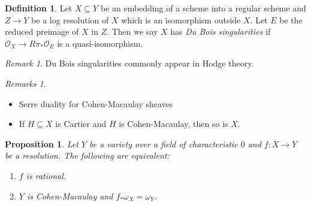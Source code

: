 \documentclass[leqno, openany]{memoir}
\newtheorem{prop}[thm]{Proposition}
\theoremstyle{definition}
\newtheorem{defn}[thm]{Definition}
\theoremstyle{remark}
\newtheorem{rmk}[thm]{Remark}
\newtheorem{rmks}[thm]{Remarks}
\theoremstyle{plain}
\theoremstyle{definition}
\theoremstyle{remark}
\newcommand{\msc}[1]{\mathscr{#1}}
\begin{document}
\begin{defn}
    Let $X \subseteq Y$ be an embedding of a scheme into a regular scheme and $Z \to Y$ be a log resolution of $X$ which is an isomorphism outside $X$. Let $E$ be the reduced preimage of $X$ in $Z$. Then we say $X$ has \textit{Du Bois singularities} if $\msc{O}_X \to R\pi_* \msc{O}_E$ is a quasi-isomorphism.
\end{defn}

\begin{rmk}
    Du Bois singularities commonly appear in Hodge theory.
\end{rmk}

\begin{rmks}\leavevmode
    \begin{itemize}
        \item Serre duality for Cohen-Macaulay sheaves
        \item If $H \subseteq X$ is Cartier and $H$ is Cohen-Macaulay, then so is $X$.
    \end{itemize}
\end{rmks}

\begin{prop}
    Let $Y$ be a variety over a field of characteristic $0$ and $f \colon X \to Y$ be a resolution. The following are equivalent:
    \begin{enumerate}
        \item $f$ is rational.
        \item $Y$ is Cohen-Macaulay and $f_* \omega_X = \omega_Y$.
    \end{enumerate}
\end{prop}
\end{document}

